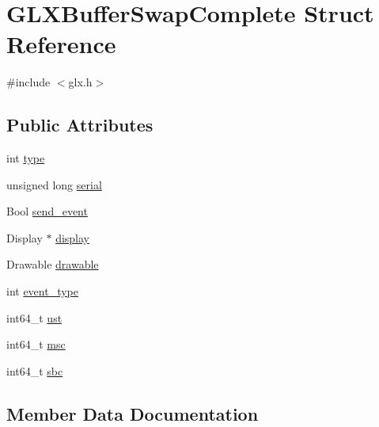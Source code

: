 \hypertarget{struct_g_l_x_buffer_swap_complete}{}\section{G\+L\+X\+Buffer\+Swap\+Complete Struct Reference}
\label{struct_g_l_x_buffer_swap_complete}


{\ttfamily \#include $<$glx.\+h$>$}

\subsection*{Public Attributes}
\begin{DoxyCompactItemize}
\item 
int \hyperlink{struct_g_l_x_buffer_swap_complete_a24826cc08d5619285041846b29ce698c}{type}
\item 
unsigned long \hyperlink{struct_g_l_x_buffer_swap_complete_ac52e1c5b9b030dd77e9d32f2eb5450da}{serial}
\item 
Bool \hyperlink{struct_g_l_x_buffer_swap_complete_a991953f319d092b7399c02d256ef00e6}{send\+\_\+event}
\item 
Display $\ast$ \hyperlink{struct_g_l_x_buffer_swap_complete_ad5ab9343db33df2e2abe97999d00e678}{display}
\item 
Drawable \hyperlink{struct_g_l_x_buffer_swap_complete_ae9860c5612d3a583081a9e1bac9731d4}{drawable}
\item 
int \hyperlink{struct_g_l_x_buffer_swap_complete_a39b8f393f8eaa54db030751edac25d7d}{event\+\_\+type}
\item 
int64\+\_\+t \hyperlink{struct_g_l_x_buffer_swap_complete_ab0dfbf0a8ea5e9f274bd4564fd0b64b2}{ust}
\item 
int64\+\_\+t \hyperlink{struct_g_l_x_buffer_swap_complete_ad856b4068246e7a96ca26a938929ca15}{msc}
\item 
int64\+\_\+t \hyperlink{struct_g_l_x_buffer_swap_complete_a0830bc671be1a7ef8bceff791f3463a7}{sbc}
\end{DoxyCompactItemize}


\subsection{Member Data Documentation}
\mbox{\label{struct_g_l_x_buffer_swap_complete_ad5ab9343db33df2e2abe97999d00e678}} 
